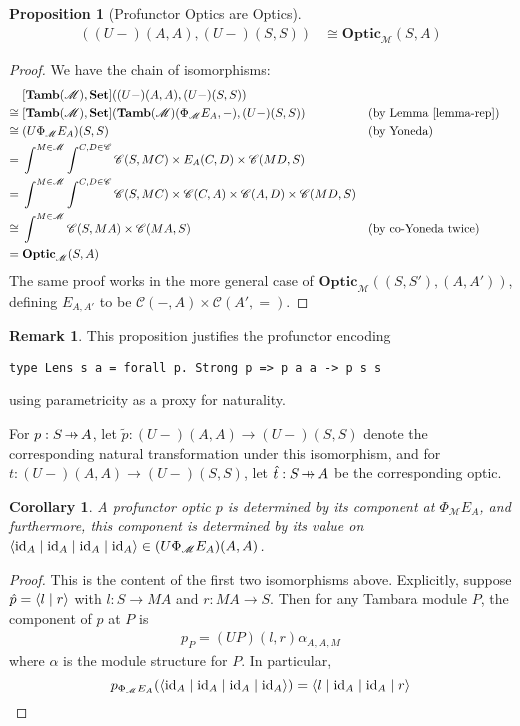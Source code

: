 \documentclass[11pt,a4paper]{article}
\theoremstyle{plain}
\newtheorem{proposition}[theorem]{Proposition}
\newtheorem{corollary}[theorem]{Corollary}
\theoremstyle{definition}
\newtheorem{remark}[theorem]{Remark}
\newcommand{\C}{\mathscr{C}}
\newcommand{\M}{\mathscr{M}}
\newcommand{\Pastro}{\Phi}
\newcommand{\Set}{\mathbf{Set}}
\newcommand{\Tamb}{\mathbf{Tamb}}
\newcommand{\Optic}{\mathbf{Optic}}
\newcommand{\id}{\mathrm{id}}
\newcommand{\rep}[2]{{\ensuremath \left\langle #1 \mid #2 \right\rangle}}
\newcommand{\repfour}[4]{{\ensuremath \langle #1 \mid #2 \mid #3 \mid #4 \rangle}}
\newcommand{\hto}{\ensuremath{\,\mathaccent\shortmid\rightarrow\,}}
\begin{document}
\begin{proposition}[Profunctor Optics are Optics]\label{prop-profunctor-optics-are-optics}
  \begin{align*}
    [\Tamb(\M), \Set]((U-)(A,A),(U-)(S,S)) &\cong \Optic_\M(S, A)
  \end{align*}
\end{proposition}
\begin{proof}
  We have the chain of isomorphisms:
  \begin{align*}
    &[\Tamb(\M), \Set]((U-)(A,A),(U-)(S,S)) \\
    \cong \;&[\Tamb(\M), \Set](\Tamb(\M)(\Pastro_\M E_A, -), (U-)(S,S))  && \text{(by Lemma \ref{lemma-rep})}\\
    \cong \;&(U\Pastro_\M E_A)(S,S)  && \text{(by Yoneda)} \\
    = \;&\int^{M \in \M} \int^{C,D \in \C} \C(S, MC) \times E_A(C,D) \times \C(MD,S) \\
    = \;&\int^{M \in \M} \int^{C,D \in \C} \C(S, MC) \times \C(C,A) \times \C(A,D) \times \C(MD,S) \\
    \cong \;&\int^{M \in \M} \C(S, MA) \times \C(MA, S)  && \text{(by co-Yoneda twice)} \\
    = \;&\Optic_\M(S, A)
  \end{align*}
  The same proof works in the more general case of $\Optic_\M((S, S'), (A,A'))$, defining $E_{A, A'}$ to be $\C(-, A) \times \C(A', {=})$.
\end{proof}

\begin{remark}
  This proposition justifies the profunctor encoding
\begin{verbatim}
type Lens s a = forall p. Strong p => p a a -> p s s
\end{verbatim}
  using parametricity as a proxy for naturality.
\end{remark}

For $p : S \hto A$, let $\tilde{p} : (U-)(A,A) \rightarrow (U-)(S,S)$ denote the corresponding natural transformation under this isomorphism, and for $t : (U-)(A,A) \rightarrow (U-)(S,S)$, let $\hat{t} : S \hto A$ be the corresponding optic.

\begin{corollary}
  A profunctor optic $p$ is determined by its component at $\Pastro_\M E_A$, and furthermore, this component is determined by its value on $\repfour{\id_A}{\id_A}{\id_A}{\id_A } \in (U \Pastro_\M E_A)(A, A)$.
\end{corollary}
\begin{proof}
  This is the content of the first two isomorphisms above. Explicitly, suppose $\hat{p} = \rep{l}{r }$ with $l : S \to MA$ and $r : MA \to S$. Then for any Tambara module $P$, the component of $p$ at $P$ is
  \begin{align*}
    p_P = (UP)(l,r) \alpha_{A,A,M}
  \end{align*}
  where $\alpha$ is the module structure for $P$. In particular,
  \[
    p_{\Pastro_\M E_A}(\repfour{\id_A}{\id_A}{\id_A}{\id_A }) = \repfour{l}{\id_A}{\id_A}{r }
  \]
\end{proof}
\end{document}
